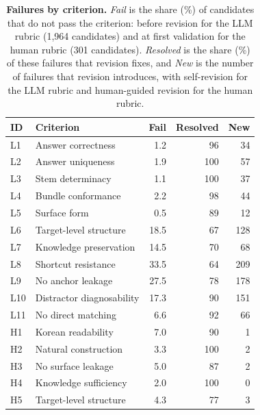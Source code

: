 \begin{table}[t]
\centering
\small
\setlength{\tabcolsep}{4pt}
\caption{\textbf{Failures by criterion.}
\textit{Fail} is the share (\%) of candidates that do not pass the criterion: before revision for the LLM rubric (1,964 candidates) and at first validation for the human rubric (301 candidates).
\textit{Resolved} is the share (\%) of these failures that revision fixes, and \textit{New} is the number of failures that revision introduces, with self-revision for the LLM rubric and human-guided revision for the human rubric.}
\label{tab:criteria}
\begin{tabular}{@{}llrrr@{}}
\toprule
\textbf{ID} & \textbf{Criterion} & \textbf{Fail} & \textbf{Resolved} & \textbf{New} \\
\midrule
L1  & Answer correctness        & 1.2  & 96  & 34  \\
L2  & Answer uniqueness         & 1.9  & 100 & 57  \\
L3  & Stem determinacy          & 1.1  & 100 & 37  \\
L4  & Bundle conformance        & 2.2  & 98  & 44  \\
L5  & Surface form              & 0.5  & 89  & 12  \\
L6  & Target-level structure    & 18.5 & 67  & 128 \\
L7  & Knowledge preservation    & 14.5 & 70  & 68  \\
L8  & Shortcut resistance       & 33.5 & 64  & 209 \\
L9  & No anchor leakage         & 27.5 & 78  & 178 \\
L10 & Distractor diagnosability & 17.3 & 90  & 151 \\
L11 & No direct matching        & 6.6  & 92  & 66  \\
\midrule
H1  & Korean readability        & 7.0  & 90  & 1   \\
H2  & Natural construction      & 3.3  & 100 & 2   \\
H3  & No surface leakage        & 5.0  & 87  & 2   \\
H4  & Knowledge sufficiency     & 2.0  & 100 & 0   \\
H5  & Target-level structure    & 4.3  & 77  & 3   \\
\bottomrule
\end{tabular}
\end{table}